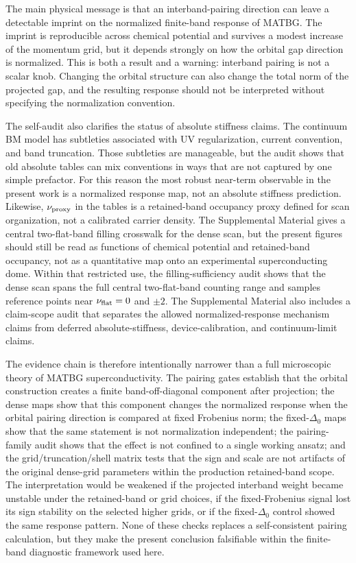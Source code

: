 \documentclass[aps,prb,reprint,superscriptaddress,floatfix,nofootinbib]{revtex4-2}
\begin{document}
The main physical message is that an interband-pairing direction can leave a
detectable imprint on the normalized finite-band response of MATBG.
The imprint is reproducible across chemical potential and survives a modest
increase of the momentum grid, but it depends strongly on how the orbital gap
direction is normalized.
This is both a result and a warning: interband pairing is not a scalar knob.
Changing the orbital structure can also change the total norm of the projected
gap, and the resulting response should not be interpreted without specifying
the normalization convention.

The self-audit also clarifies the status of absolute stiffness claims.
The continuum BM model has subtleties associated with UV regularization,
current convention, and band truncation.  Those subtleties are manageable, but
the audit shows that old absolute tables can mix conventions in ways that are
not captured by one simple prefactor.
For this reason the most robust near-term observable in the present work is a
normalized response map, not an absolute stiffness prediction.
Likewise, $\nu_{\rm proxy}$ in the tables is a retained-band occupancy proxy
defined for scan organization, not a calibrated carrier density.  The
Supplemental Material gives a central two-flat-band filling crosswalk for the
dense scan, but the present figures should still be read as functions of
chemical potential and retained-band occupancy, not as a quantitative map onto
an experimental superconducting dome.
Within that restricted use, the filling-sufficiency audit shows that the dense
scan spans the full central two-flat-band counting range and samples reference
points near $\nu_{\rm flat}=0$ and $\pm2$.
The Supplemental Material also includes a claim-scope audit that separates the
allowed normalized-response mechanism claims from deferred absolute-stiffness,
device-calibration, and continuum-limit claims.

The evidence chain is therefore intentionally narrower than a full
microscopic theory of MATBG superconductivity.
The pairing gates establish that the orbital construction creates a finite
band-off-diagonal component after projection; the dense maps show that this
component changes the normalized response when the orbital pairing direction is
compared at fixed Frobenius norm; the fixed-$\Delta_0$ maps show that the same
statement is not normalization independent; the pairing-family audit shows
that the effect is not confined to a single working ansatz; and the
grid/truncation/shell matrix tests that the sign and scale are not artifacts
of the original dense-grid parameters within the production retained-band
scope.
The interpretation would be weakened if the projected interband weight became
unstable under the retained-band or grid choices, if the fixed-Frobenius signal
lost its sign stability on the selected higher grids, or if the fixed-$\Delta_0$
control showed the same response pattern.
None of these checks replaces a self-consistent pairing calculation, but they
make the present conclusion falsifiable within the finite-band diagnostic
framework used here.
\end{document}
